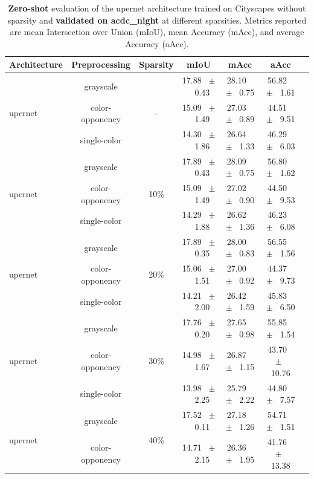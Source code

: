 \begin{table}[h]
  \centering
  \caption{\textbf{Zero-shot} evaluation of the upernet architecture trained on Cityscapes without sparsity and \textbf{validated on acdc_night} at different sparsities. Metrics reported are mean Intersection over Union (mIoU), mean Accuracy (mAcc), and average Accuracy (aAcc).}
  \begin{tabular}{@{}lccc ccc@{}}
    \toprule
    Architecture & Preprocessing & Sparsity & mIoU & mAcc & aAcc \\
    \midrule
    \multirow{3}{*}{upernet} & grayscale & \multirow{3}{*}{-} & 17.88 ~$\pm$~ 0.43 & 28.10 ~$\pm$~ 0.75 & 56.82 ~$\pm$~ 1.61 \\
    & color-opponency &  & 15.09 ~$\pm$~ 1.49 & 27.03 ~$\pm$~ 0.89 & 44.51 ~$\pm$~ 9.51 \\
    & single-color &  & 14.30 ~$\pm$~ 1.86 & 26.64 ~$\pm$~ 1.33 & 46.29 ~$\pm$~ 6.03 \\
    \midrule
    \multirow{3}{*}{upernet} & grayscale & \multirow{3}{*}{10\%} & 17.89 ~$\pm$~ 0.43 & 28.09 ~$\pm$~ 0.75 & 56.80 ~$\pm$~ 1.62 \\
    & color-opponency &  & 15.09 ~$\pm$~ 1.49 & 27.02 ~$\pm$~ 0.90 & 44.50 ~$\pm$~ 9.53 \\
    & single-color &  & 14.29 ~$\pm$~ 1.88 & 26.62 ~$\pm$~ 1.36 & 46.23 ~$\pm$~ 6.08 \\
    \midrule
    \multirow{3}{*}{upernet} & grayscale & \multirow{3}{*}{20\%} & 17.89 ~$\pm$~ 0.35 & 28.00 ~$\pm$~ 0.83 & 56.55 ~$\pm$~ 1.56 \\
    & color-opponency &  & 15.06 ~$\pm$~ 1.51 & 27.00 ~$\pm$~ 0.92 & 44.37 ~$\pm$~ 9.73 \\
    & single-color &  & 14.21 ~$\pm$~ 2.00 & 26.42 ~$\pm$~ 1.59 & 45.83 ~$\pm$~ 6.50 \\
    \midrule
    \multirow{3}{*}{upernet} & grayscale & \multirow{3}{*}{30\%} & 17.76 ~$\pm$~ 0.20 & 27.65 ~$\pm$~ 0.98 & 55.85 ~$\pm$~ 1.54 \\
    & color-opponency &  & 14.98 ~$\pm$~ 1.67 & 26.87 ~$\pm$~ 1.15 & 43.70 ~$\pm$~ 10.76 \\
    & single-color &  & 13.98 ~$\pm$~ 2.25 & 25.79 ~$\pm$~ 2.22 & 44.80 ~$\pm$~ 7.57 \\
    \midrule
    \multirow{3}{*}{upernet} & grayscale & \multirow{3}{*}{40\%} & 17.52 ~$\pm$~ 0.11 & 27.18 ~$\pm$~ 1.26 & 54.71 ~$\pm$~ 1.51 \\
    & color-opponency &  & 14.71 ~$\pm$~ 2.15 & 26.36 ~$\pm$~ 1.95 & 41.76 ~$\pm$~ 13.38 \\

\end{tabular}
\end{table}

